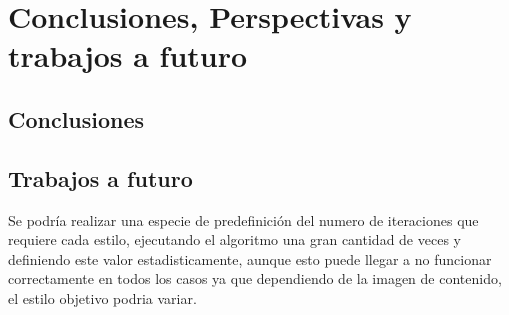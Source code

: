 \documentclass[a4paper,11pt,spanish]{book}
\begin{document}
\chapter{Conclusiones, Perspectivas y trabajos a futuro}
  \section{Conclusiones}
  \section{Trabajos a futuro}
    Se podría realizar una especie de predefinición del numero de iteraciones que requiere cada estilo, ejecutando el algoritmo una gran cantidad de veces y definiendo este valor 
    estadisticamente, aunque esto puede llegar a no funcionar correctamente en todos los casos ya que dependiendo de la imagen de contenido, el estilo objetivo podria variar.
\printindex
\end{document}
